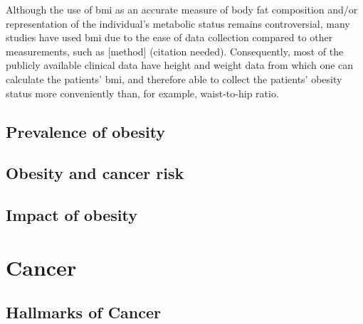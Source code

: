 Although the use of \gls{bmi} as an accurate measure of body fat composition and/or representation of the individual's metabolic status remains controversial, many studies have used \gls{bmi} due to the ease of data collection compared to other measurements, such as [method] (citation needed).
Consequently, most of the publicly available clinical data have height and weight data from which one can calculate the patients' \gls{bmi}, and therefore able to collect the patients' obesity status more conveniently than, for example, waist-to-hip ratio.

\subsection{Prevalence of obesity}
\label{sub:prevalence_of_obesity}







\subsection{Obesity and cancer risk}
\label{sub:obesity_and_cancer_risk}

\subsection{Impact of obesity}
\label{sub:impact_of_obesity}





\section{Cancer}
\label{sec:cancer}


\subsection{Hallmarks of Cancer}
\label{subsec:cancerhallmarks}


